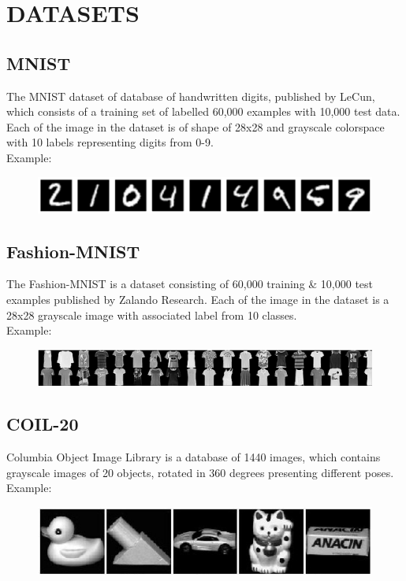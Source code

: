\documentclass[letterpaper, 10 pt, conference]{ieeeconf}  %
\begin{document}
\vspace{3mm}
\section{DATASETS}
\subsection{MNIST}
The MNIST dataset of database of handwritten digits, published by LeCun, which consists of a training set of labelled 60,000 examples with 10,000 test data. Each of the image in the dataset is of shape of 28x28 and grayscale colorspace with 10 labels representing digits from 0-9.
\vspace{1mm}
\\Example:
\begin{figure}[h!]
	\centering
	\includegraphics[width=0.94\linewidth]{DATA1.png}
	\label{fig:DATA1.png}
\end{figure}

\subsection{Fashion-MNIST}
The Fashion-MNIST is a dataset consisting of 60,000 training & 10,000 test examples published by Zalando Research. Each of the image in the dataset is a 28x28 grayscale image with associated label from 10 classes.
\vspace{1mm}
\\Example:
\begin{figure}[h!]
	\centering
	\includegraphics[width=0.94\linewidth]{data2.png}
	\label{fig:data2.png}
\end{figure}

\subsection{COIL-20}
Columbia Object Image Library is a database of 1440 images, which contains grayscale images of 20 objects, rotated in 360 degrees presenting different poses. 
\vspace{1mm}
\\Example:
\begin{figure}[h!]
	\centering
	\includegraphics[width=0.94\linewidth]{data3.png}
	\label{fig:data3.png}
\end{figure}
\end{document}
